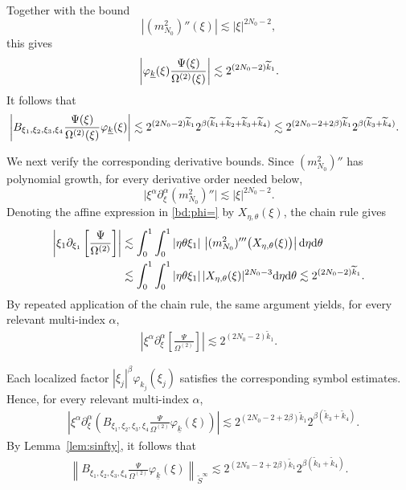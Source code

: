\documentclass[UTF-8,reqno]{amsart}
\numberwithin{equation}{section}
\theoremstyle{definition}
\def\dif{{\mathord{{\rm d}}}}
\def\dif{{\mathord{{\rm d}}}}
\begin{document}
Together with the bound
\[
    |(m_{N_0}^2)''(\xi)|
    \lesssim |\xi|^{2N_0-2},
\]
this gives 
\begin{align}
\left|
    \varphi_{\underline{k}}(\xi)
    \frac{\Psi(\xi)}{\Omega^{(2)}(\xi)}
\right|
\lesssim
2^{(2N_0-2)\widetilde{k}_1}.
\notag
\end{align}
It follows that
\begin{align}
&\left|
B_{\xi_1,\xi_2,\xi_3,\xi_4}
\frac{\Psi(\xi)}{\Omega^{(2)}(\xi)}
\varphi_{\underline k}(\xi)
\right| 
\lesssim
2^{(2N_0-2)\widetilde{k}_1}
2^{\beta(
    \widetilde{k}_1+\widetilde{k}_2
    +\widetilde{k}_3+\widetilde{k}_4)}
\lesssim
2^{(2N_0-2+2\beta)\widetilde{k}_1}
2^{\beta(\widetilde{k}_3+\widetilde{k}_4)}.
\notag
\end{align}

We next verify the corresponding derivative bounds. Since
$(m_{N_0}^2)''$ has polynomial growth, for every derivative order
needed below,
\[
    \big|
        \xi^\alpha
        \partial_\xi^\alpha
        (m_{N_0}^2)''
    \big|
    \lesssim
    |\xi|^{2N_0-2}.
\]
Denoting the affine expression in \eqref{bd:phi=} by
$X_{\eta,\theta}(\xi)$, the chain rule gives
\begin{align*}
\left|
\xi_1\partial_{\xi_1}
\left[
    \frac{\Psi}{\Omega^{(2)}}
\right]
\right|
&\lesssim
\int_0^1\int_0^1
|\eta\theta\xi_1|\,
\left|
    (m_{N_0}^2)'''
    \bigl(X_{\eta,\theta}(\xi)\bigr)
\right|
\dif\eta\dif\theta
\\
&\lesssim
\int_0^1\int_0^1
|\eta\theta\xi_1|\,
|X_{\eta,\theta}(\xi)|^{2N_0-3}
\dif\eta\dif\theta \lesssim
2^{(2N_0-2)\widetilde{k}_1}.
\end{align*}
By repeated application of the chain rule, the same argument yields,
for every relevant multi-index $\alpha$,
\begin{align}
\left|
\xi^\alpha\partial_{\xi}^\alpha
\left[
    \frac{\Psi}{\Omega^{(2)}}
\right]
\right|
\lesssim
2^{(2N_0-2)\widetilde{k}_1}.
\label{bd:example}
\end{align}

Each localized factor
$|\xi_j|^\beta\varphi_{k_j}(\xi_j)$ satisfies the corresponding
symbol estimates. Hence, for every relevant multi-index $\alpha$,
\begin{align*}
&\left|
\xi^\alpha\partial_{\xi}^\alpha
\left(
B_{\xi_1,\xi_2,\xi_3,\xi_4}
\frac{\Psi}{\Omega^{(2)}}
\varphi_{\underline k}(\xi)
\right)
\right| 
\lesssim
2^{(2N_0-2+2\beta)\widetilde{k}_1}
2^{\beta(\widetilde{k}_3+\widetilde{k}_4)}.
\end{align*}
By Lemma~\ref{lem:sinfty}, it follows that
\begin{align}
\left\|
B_{\xi_1,\xi_2,\xi_3,\xi_4}
\frac{\Psi}{\Omega^{(2)}}
\varphi_{\underline k}(\xi)
\right\|_{\widetilde S^\infty}
\lesssim
2^{(2N_0-2+2\beta)\widetilde{k}_1}
2^{\beta(\widetilde{k}_3+\widetilde{k}_4)}.
\label{bd:bpsi/phi2}
\end{align}
\end{document}
